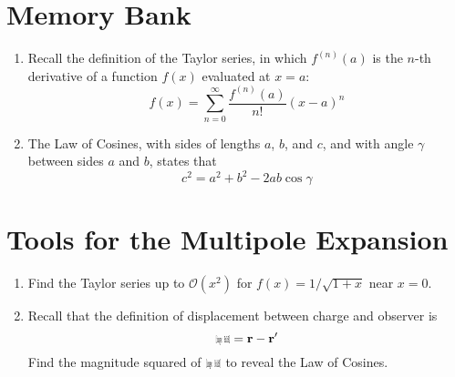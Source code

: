 \documentclass[12pt]{article}
\def\brcurs{{\mbox{$\resizebox{.16in}{.08in}{\texttt{[image: BoldR]}}$}}}
\begin{document}
\maketitle

\section{Memory Bank}

\begin{enumerate}
\item Recall the definition of the Taylor series, in which $f^{(n)}(a)$ is the $n$-th derivative of a function $f(x)$ evaluated at $x = a$:
\begin{equation}
f(x) = \sum_{n=0}^{\infty} \frac{f^{(n)}(a)}{n!}(x-a)^n
\end{equation}
\item The Law of Cosines, with sides of lengths $a$, $b$, and $c$, and with angle $\gamma$ between sides $a$ and $b$, states that
\begin{equation}
c^2 = a^2 + b^2 - 2 a b \cos\gamma
\end{equation}
\end{enumerate}

\section{Tools for the Multipole Expansion}

\begin{enumerate}
\item Find the Taylor series up to $\mathcal{O}(x^2)$ for $f(x) = 1/\sqrt{1+x}$ near $x = 0$. \\ \vspace{3cm}
\item Recall that the definition of displacement between charge and observer is
\begin{equation}
\brcurs = \mathbf{r} - \mathbf{r}'
\end{equation}
Find the magnitude squared of $\brcurs$ to reveal the Law of Cosines.
\end{enumerate}
\end{document}
